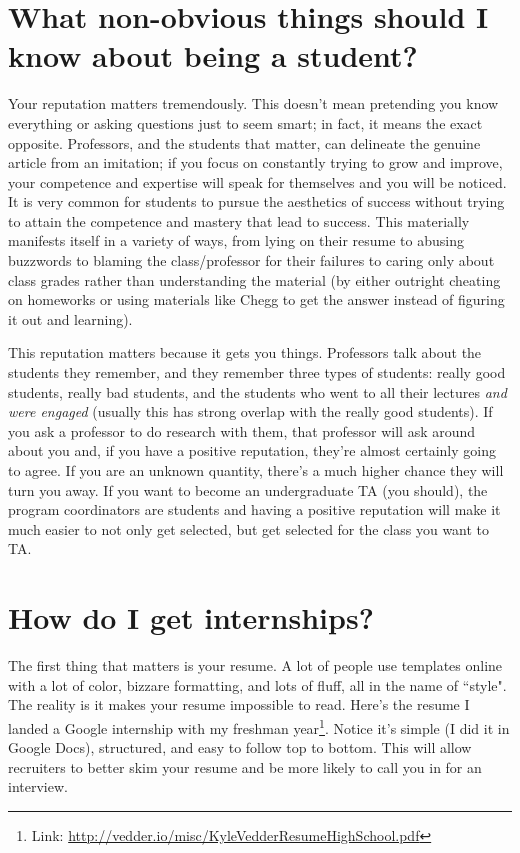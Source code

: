 \documentclass{article}
\begin{document}
\section{What non-obvious things should I know about being a student?}
Your reputation matters tremendously. This doesn't mean pretending you know everything or asking questions just to seem smart; in fact, it means the exact opposite. Professors, and the students that matter, can delineate the genuine article from an imitation; if you focus on constantly trying to grow and improve, your competence and expertise will speak for themselves and you will be noticed. It is very common for students to pursue the aesthetics of success without trying to attain the competence and mastery that lead to success. This materially manifests itself in a variety of ways, from lying on their resume to abusing buzzwords to blaming the class/professor for their failures to caring only about class grades rather than understanding the material (by either outright cheating on homeworks or using materials like Chegg to get the answer instead of figuring it out and learning).

This reputation matters because it gets you things. Professors talk about the students they remember, and they remember three types of students: really good students, really bad students, and the students who went to all their lectures \textit{and were engaged} (usually this has strong overlap with the really good students). If you ask a professor to do research with them, that professor will ask around about you and, if you have a positive reputation, they're almost certainly going to agree. If you are an unknown quantity, there's a much higher chance they will turn you away. If you want to become an undergraduate TA (you should), the program coordinators are students and having a positive reputation will make it much easier to not only get selected, but get selected for the class you want to TA.

\section{How do I get internships?}
The first thing that matters is your resume. A lot of people use templates online with a lot of color, bizzare formatting, and lots of fluff, all in the name of ``style". The reality is it makes your resume impossible to read. Here's the resume I landed a Google internship with my freshman year\footnote{Link: \url{http://vedder.io/misc/KyleVedderResumeHighSchool.pdf}}. Notice it's simple (I did it in Google Docs), structured, and easy to follow top to bottom. This will allow recruiters to better skim your resume and be more likely to call you in for an interview.
\end{document}
